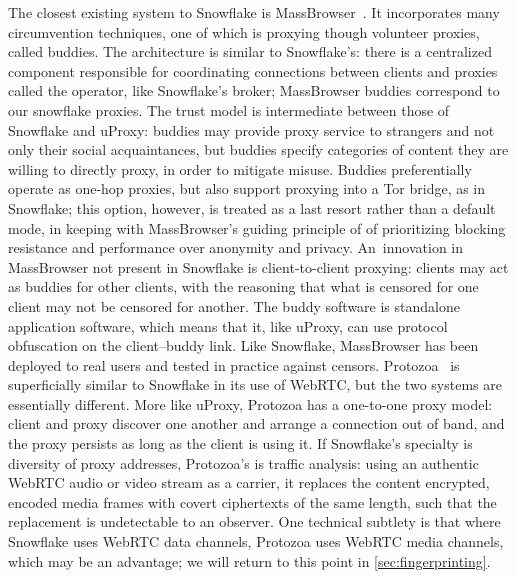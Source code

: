\documentclass[letterpaper,twocolumn]{article}
\begin{document}
The closest existing system to Snowflake is MassBrowser~\cite{Nasr2020a}.
It incorporates many circumvention techniques, one of which is
proxying though volunteer proxies, called buddies.
The architecture is similar to Snowflake's:
there is a centralized component responsible for coordinating
connections between clients and proxies called the operator,
like Snowflake's broker;
MassBrowser buddies correspond to our snowflake proxies.
The trust model is intermediate between those of Snowflake and uProxy:
buddies may provide proxy service to strangers and not only their social acquaintances,
but buddies specify categories of content they are willing to directly proxy,
in order to mitigate misuse.
Buddies preferentially operate as one-hop proxies,
but also support proxying into a Tor bridge, as in Snowflake;
this option, however, is treated as a last resort rather than a default mode,
in keeping with MassBrowser's guiding principle of
of prioritizing blocking resistance and performance
over anonymity and privacy.
An~innovation in MassBrowser not present in Snowflake is client-to-client proxying:
clients may act as buddies for other clients,
with the reasoning that what is censored for one client may not be censored for another.
The buddy software is standalone application software,
which means that it, like uProxy, can use protocol obfuscation
on the client--buddy link.
Like Snowflake, MassBrowser has been deployed to real users
and tested in practice against censors.
Protozoa~\cite{Barradas2020a}
is superficially similar
to Snowflake in its use of WebRTC,
but the two systems are essentially different.
More like uProxy, Protozoa has a one-to-one proxy model:
client and proxy discover one another and arrange a connection out of band,
and the proxy persists as long as the client is using it.
If Snowflake's specialty is diversity of proxy addresses,
Protozoa's is traffic analysis:
using an authentic WebRTC audio or video stream as a carrier,
it replaces the content encrypted, encoded media frames
with covert ciphertexts of the same length,
such that the replacement is undetectable to an observer.
One technical subtlety is that where Snowflake uses
WebRTC data channels,
Protozoa uses WebRTC media channels,
which may be an advantage;
we will return to this point in \autoref{sec:fingerprinting}.
\end{document}

